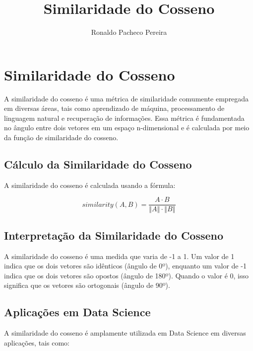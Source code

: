 \documentclass[12pt, a4paper]{article}
\title{Similaridade do Cosseno}
\author{Ronaldo Pacheco Pereira}
\begin{document}
\maketitle

\section{Similaridade do Cosseno}

A similaridade do cosseno é uma métrica de similaridade comumente empregada em diversas áreas, tais como aprendizado de máquina, processamento de linguagem natural e recuperação de informações. Essa métrica é fundamentada no ângulo entre dois vetores em um espaço n-dimensional e é calculada por meio da função de similaridade do cosseno.

\subsection{Cálculo da Similaridade do Cosseno}

A similaridade do cosseno é calculada usando a fórmula:

\[similarity(A, B) = \frac{A \cdot B}{\left\Vert A \right\Vert \cdot \left\Vert B \right\Vert}\]

\subsection{Interpretação da Similaridade do Cosseno}
A similaridade do cosseno é uma medida que varia de -1 a 1. Um valor de 1 indica que os dois vetores são idênticos (ângulo de 0º), enquanto um valor de -1 indica que os dois vetores são opostos (ângulo de 180º). Quando o valor é 0, isso significa que os vetores são ortogonais (ângulo de 90º).




\subsection{Aplicações em Data Science}

A similaridade do cosseno é amplamente utilizada em Data Science em diversas aplicações, tais como:
\end{document}
